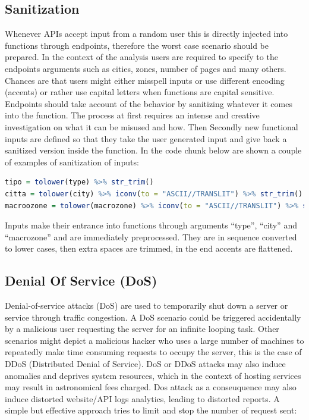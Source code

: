 \documentclass[
  12pt,
  a4paper,
  oneside]{book}
\theoremstyle{definition}
\theoremstyle{definition}
\theoremstyle{definition}
\theoremstyle{remark}
\begin{document}
\hypertarget{sanitize}{%
\subsection{Sanitization}\label{sanitize}}

Whenever APIs accept input from a random user this is directly injected into functions through endpoints, therefore the worst case scenario should be prepared. In the context of the analysis users are required to specify to the endpoints arguments such as cities, zones, number of pages and many others. Chances are that users might either misspell inputs or use different encoding (accents) or rather use capital letters when functions are capital sensitive. Endpoints should take account of the behavior by sanitizing whatever it comes into the function. The process at first requires an intense and creative investigation on what it can be misused and how. Then Secondly new functional inputs are defined so that they take the user generated input and give back a sanitized version inside the function. In the code chunk below are shown a couple of examples of sanitization of inputs:

\begin{lstlisting}[language=R]
tipo = tolower(type) %>% str_trim()
citta = tolower(city) %>% iconv(to = "ASCII//TRANSLIT") %>% str_trim()
macroozone = tolower(macrozone) %>% iconv(to = "ASCII//TRANSLIT") %>% str_trim()
\end{lstlisting}

Inputs make their entrance into functions through arguments ``type'', ``city'' and ``macrozone'' and are immediately preprocessed. They are in sequence converted to lower cases, then extra spaces are trimmed, in the end accents are flattened.

\hypertarget{DoS}{%
\subsection{Denial Of Service (DoS)}\label{DoS}}

Denial-of-service attacks (DoS) are used to temporarily shut down a server or service through traffic congestion. A DoS scenario could be triggered accidentally by a malicious user requesting the server for an infinite looping task. Other scenarios might depict a malicious hacker who uses a large number of machines to repeatedly make time consuming requests to occupy the server, this is the case of DDoS (Distributed Denial of Service). DoS or DDoS attacks may also induce anomalies and deprives system resources, which in the context of hosting services may result in astronomical fees charged. Dos attack as a conseuquence may also induce distorted website/API logs analytics, leading to distorted reports.
A simple but effective approach tries to limit and stop the number of request sent:
\end{document}
